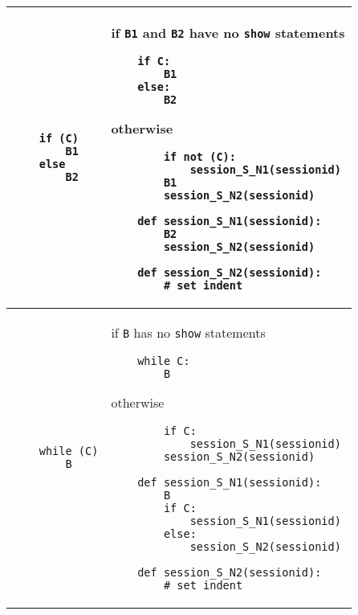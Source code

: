 \documentclass{WigReport}
\begin{document}
    \begin{tabular}{| p{20em} | p{30em} |}
    \hline
    \begin{verbatim} 
    if (C)
        B1
    else
        B2
    \end{verbatim}
    & 
    if {\tt B1} and {\tt B2} have no {\tt show} statements \newline
    \begin{verbatim}
    if C:
        B1
    else:
        B2
    \end{verbatim}
    otherwise
    \begin{verbatim}
        if not (C):
            session_S_N1(sessionid)
        B1
        session_S_N2(sessionid)

    def session_S_N1(sessionid):
        B2
        session_S_N2(sessionid)
    
    def session_S_N2(sessionid):
        # set indent
    \end{verbatim}
    \\ \hline       
    \begin{verbatim}
    while (C)
        B
    \end{verbatim}
    &
    if {\tt B} has no {\tt show} statements
    \begin{verbatim}
    while C:
        B
    \end{verbatim}
    otherwise
    \begin{verbatim}
        if C:
            session_S_N1(sessionid)
        session_S_N2(sessionid)

    def session_S_N1(sessionid):
        B
        if C:
            session_S_N1(sessionid)
        else:
            session_S_N2(sessionid)

    def session_S_N2(sessionid):
        # set indent
    \end{verbatim}
    \\ \hline
\end{tabular}

%
%
%
%
%
%
%
%
%
%
%
%
%
%
%
%
%
%
%
\end{document}

